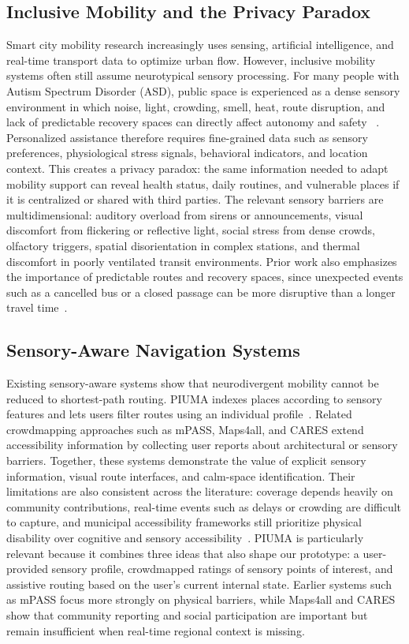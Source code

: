 \documentclass[lettersize,journal]{IEEEtran}
\begin{document}
\subsection{Inclusive Mobility and the Privacy Paradox}
Smart city mobility research increasingly uses sensing, artificial
intelligence, and real-time transport data to optimize urban flow.
However, inclusive mobility systems often still assume neurotypical
sensory processing. For many people with Autism Spectrum Disorder
(ASD), public space is experienced as a dense sensory environment in
which noise, light, crowding, smell, heat, route disruption, and lack of
predictable recovery spaces can directly affect autonomy and safety
~\cite{maclennan2023}. Personalized assistance therefore requires
fine-grained data such as sensory preferences, physiological stress
signals, behavioral indicators, and location context. This creates a
privacy paradox: the same information needed to adapt mobility support
can reveal health status, daily routines, and vulnerable places if it is
centralized or shared with third parties.
The relevant sensory barriers are multidimensional: auditory overload
from sirens or announcements, visual discomfort from flickering or
reflective light, social stress from dense crowds, olfactory triggers,
spatial disorientation in complex stations, and thermal discomfort in
poorly ventilated transit environments. Prior work also emphasizes the
importance of predictable routes and recovery spaces, since unexpected
events such as a cancelled bus or a closed passage can be more
disruptive than a longer travel time~\cite{maclennan2023,beck2025}.

\subsection{Sensory-Aware Navigation Systems}
Existing sensory-aware systems show that neurodivergent mobility cannot
be reduced to shortest-path routing. PIUMA indexes places according to
sensory features and lets users filter routes using an individual
profile~\cite{cena2023}. Related crowdmapping approaches such as
mPASS, Maps4all, and CARES extend accessibility information by
collecting user reports about architectural or sensory barriers.
Together, these systems demonstrate the value of explicit sensory
information, visual route interfaces, and calm-space identification.
Their limitations are also consistent across the literature: coverage
depends heavily on community contributions, real-time events such as
delays or crowding are difficult to capture, and municipal accessibility
frameworks still prioritize physical disability over cognitive and
sensory accessibility~\cite{garroussi2025}.
PIUMA is particularly relevant because it combines three ideas that also
shape our prototype: a user-provided sensory profile, crowdmapped
ratings of sensory points of interest, and assistive routing based on
the user's current internal state. Earlier systems such as mPASS focus
more strongly on physical barriers, while Maps4all and CARES show that
community reporting and social participation are important but remain
insufficient when real-time regional context is missing.
\end{document}
